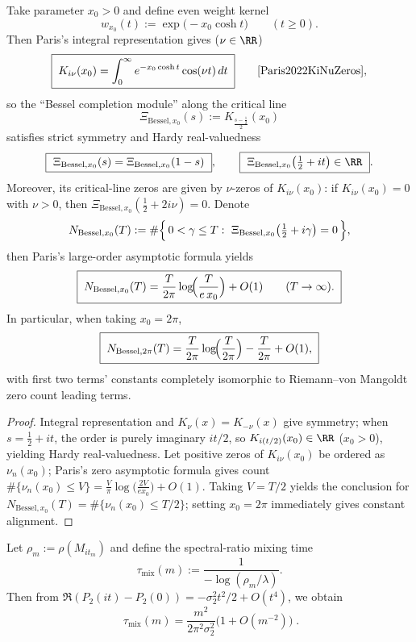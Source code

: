 \begin{proposition}\label{prop:xi-scale-mellin-bessel-kernel}
Take parameter \(x_0>0\) and define even weight kernel
\[
w_{x_0}(t):=\exp\!\bigl(-x_0\cosh t\bigr)\qquad(t\ge 0).
\]
Then Paris's integral representation gives (\(\nu\in\RR\))
\[
\boxed{\;
K_{i\nu}(x_0)=\int_{0}^{\infty}e^{-x_0\cosh t}\cos(\nu t)\,dt
\;} \qquad\text{\cite{Paris2022KiNuZeros}},
\]
so the ``Bessel completion module'' along the critical line
\[
\Xi_{\mathrm{Bessel},x_0}(s):=K_{\frac{s-\frac12}{2}}(x_0)
\]
satisfies strict symmetry and Hardy real-valuedness
\[
\boxed{\ \Xi_{\mathrm{Bessel},x_0}(s)=\Xi_{\mathrm{Bessel},x_0}(1-s)\ },\qquad
\boxed{\ \Xi_{\mathrm{Bessel},x_0}\!\left(\tfrac12+it\right)\in\RR\ }.
\]
Moreover, its critical-line zeros are given by \(\nu\)-zeros of \(K_{i\nu}(x_0)\): if \(K_{i\nu}(x_0)=0\) with \(\nu>0\), then
\(\Xi_{\mathrm{Bessel},x_0}(\tfrac12+2i\nu)=0\).
Denote
\[
N_{\mathrm{Bessel},x_0}(T):=\#\Bigl\{\,0<\gamma\le T:\ \Xi_{\mathrm{Bessel},x_0}\!\left(\tfrac12+i\gamma\right)=0\,\Bigr\},
\]
then Paris's large-order asymptotic formula \cite{Paris2022KiNuZeros} yields
\[
\boxed{\;
N_{\mathrm{Bessel},x_0}(T)
=\frac{T}{2\pi}\log\!\Bigl(\frac{T}{e\,x_0}\Bigr)+O(1)\qquad(T\to\infty).\;}
\]
In particular, when taking \(\boxed{x_0=2\pi}\),
\[
\boxed{\;
N_{\mathrm{Bessel},2\pi}(T)
=\frac{T}{2\pi}\log\!\Bigl(\frac{T}{2\pi}\Bigr)-\frac{T}{2\pi}+O(1),\;}
\]
with first two terms' constants completely isomorphic to Riemann--von Mangoldt zero count leading terms.
\end{proposition}
\begin{proof}
Integral representation and \(K_\nu(x)=K_{-\nu}(x)\) give symmetry; when \(s=\tfrac12+it\), the order is purely imaginary \(i t/2\), so \(K_{i(t/2)}(x_0)\in\RR\) (\(x_0>0\)), yielding Hardy real-valuedness.
Let positive zeros of \(K_{i\nu}(x_0)\) be ordered as \(\nu_n(x_0)\); Paris's zero asymptotic formula gives count
\(\#\{\nu_n(x_0)\le V\}=\frac{V}{\pi}\log\!\bigl(\frac{2V}{e x_0}\bigr)+O(1)\).
Taking \(V=T/2\) yields the conclusion for \(N_{\mathrm{Bessel},x_0}(T)=\#\{\nu_n(x_0)\le T/2\}\); setting \(x_0=2\pi\) immediately gives constant alignment.
\end{proof}

\begin{corollary}\label{cor:near1-pole-taumix-m2}
Let \(\rho_m:=\rho(M_{it_m})\) and define the spectral-ratio mixing time
\[
\tau_{\mathrm{mix}}(m):=\frac{1}{-\log(\rho_m/\lambda)}.
\]
Then from \(\Re(P_2(it)-P_2(0))=-\sigma_2^2 t^2/2+O(t^4)\), we obtain
\[
\boxed{\;
\tau_{\mathrm{mix}}(m)
=\frac{m^2}{2\pi^2\sigma_2^2}\bigl(1+O(m^{-2})\bigr)\; }.
\]
\end{corollary}

